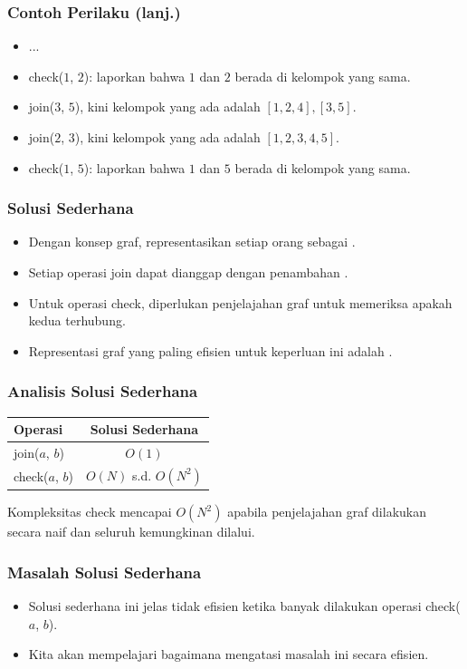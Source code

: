 \begin{frame}
\frametitle{Contoh Perilaku (lanj.)}
\begin{itemize}
  \item ...
  \item check($1$, $2$): laporkan bahwa $1$ dan $2$ berada di kelompok yang sama.
  \item join($3$, $5$), kini kelompok yang ada adalah $[1, 2, 4], [3, 5]$.
  \item join($2$, $3$), kini kelompok yang ada adalah $[1, 2, 3, 4, 5]$.
  \item check($1$, $5$): laporkan bahwa $1$ dan $5$ berada di kelompok yang sama.
\end{itemize}
\end{frame}

\begin{frame}
\frametitle{Solusi Sederhana}
\begin{itemize}
  \item Dengan konsep graf, representasikan setiap orang sebagai \fnode.
  \item Setiap operasi join dapat dianggap dengan penambahan \fedge.
  \item Untuk operasi check, diperlukan penjelajahan graf untuk memeriksa apakah kedua \fnode terhubung.
  \item Representasi graf yang paling efisien untuk keperluan ini adalah \fadjacencylist.
\end{itemize}
\end{frame}

\begin{frame}
\frametitle{Analisis Solusi Sederhana}
\begin{table}[ht]
  \begin{tabular}{|l|c|}
    \hline Operasi  & Solusi Sederhana \\
    \hline  join($a$, $b$) & $O(1)$  \\
    \hline  check($a$, $b$) & $O(N)$ s.d. $O(N^2)$\\
    \hline
  \end{tabular}
\end{table}  
Kompleksitas check mencapai $O(N^2)$ apabila penjelajahan graf dilakukan secara naif dan seluruh kemungkinan \fedge dilalui.
\end{frame}

\begin{frame}
\frametitle{Masalah Solusi Sederhana}
\begin{itemize}
  \item Solusi sederhana ini jelas tidak efisien ketika banyak dilakukan operasi check($a$, $b$).
  \item Kita akan mempelajari bagaimana \pdjs mengatasi masalah ini secara efisien.
\end{itemize}
\end{frame}


